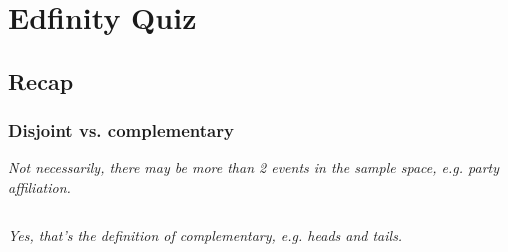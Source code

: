 \documentclass[slidestop,compress,mathserif]{beamer}
\makeatletter
\newcommand{\soln}[1]{\textit{#1}}
\def\chp3@path{../../Chp 3}
\makeatother
\begin{document}





\section{Edfinity Quiz}


\subsection{Recap}


\begin{frame}
\frametitle{Disjoint vs. complementary}


\pause

\soln{Not necessarily, there may be more than 2 events in the sample space, e.g. party affiliation.}

\pause
$\:$ \\


\pause

\soln{Yes, that's the definition of complementary, e.g. heads and tails. }

\end{frame}
\end{document}
